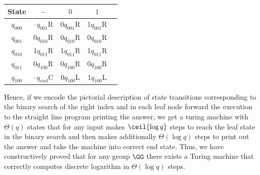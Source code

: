 \documentclass{crypto-exercise}
\begin{document}
\begin{solution}
\begin{center}
\begin{tabular}{|c|c|c|c|c|}
\hline
 State & -- & $0$ & $1$\\
 \hline
 $q_{000}$ &--$q_{001}$R & 0$q_{001}$R & 1$q_{001}$R \\ 
 $q_{001}$ & 0$q_{010}$R & 0$q_{010}$R & 0$q_{010}$R \\ 
 $q_{010}$ & 1$q_{011}$R & 1$q_{011}$R & 1$q_{011}$R \\ 
 $q_{011}$ & 0$q_{100}$R & 0$q_{100}$R & 0$q_{100}$R \\ 
 $q_{100}$ &--$q_{end}$C & 0$q_{100}$L & 1$q_{100}$L \\ 
\hline
\end{tabular}
\end{center}           
Hence, if we encode the pictorial description of state transitions corresponding to the binary search of the right index and in each leaf node forward the execution to the straight line program printing the answer, we get a turing machine with $\Theta(q)$ states that for any input makes $\ceil{\log q}$ steps to reach the leaf state in the binary search and then makes additionally $\Theta(\log q)$ steps to print out the answer and take the machine into correct end state. Thus, we have constructively proved that for any group $\GG$ there exists a Turing machine that correctly computes discrete logarithm in $\Theta(\log q)$ steps.    


\end{solution}
\end{document}
